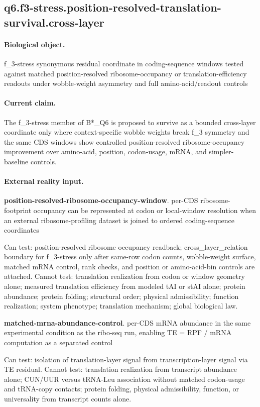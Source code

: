 \subsection{q6.f3-stress.position-resolved-translation-survival.cross-layer}

\paragraph{Biological object.} f\_3-stress synonymous residual coordinate in coding-sequence windows tested against matched position-resolved ribosome-occupancy or translation-efficiency readouts under wobble-weight asymmetry and full amino-acid/readout controls

\paragraph{Current claim.} The f\_3-stress member of B*\_Q6 is proposed to survive as a bounded cross-layer coordinate only where context-specific wobble weights break f\_3 symmetry and the same CDS windows show controlled position-resolved ribosome-occupancy improvement over amino-acid, position, codon-usage, mRNA, and simpler-baseline controls.

\paragraph{External reality input.}
\textbf{position-resolved-ribosome-occupancy-window}. per-CDS ribosome-footprint occupancy can be represented at codon or local-window resolution when an external ribosome-profiling dataset is joined to ordered coding-sequence coordinates

Can test: position-resolved ribosome occupancy readback; cross\_layer\_relation boundary for f\_3-stress only after same-row codon counts, wobble-weight surface, matched mRNA control, rank checks, and position or amino-acid-bin controls are attached. Cannot test: translation realization from codon or window geometry alone; measured translation efficiency from modeled tAI or stAI alone; protein abundance; protein folding; structural order; physical admissibility; function realization; system phenotype; translation mechanism; global biological law.

\textbf{matched-mrna-abundance-control}. per-CDS mRNA abundance in the same experimental condition as the ribo-seq run, enabling TE = RPF / mRNA computation as a separated control

Can test: isolation of translation-layer signal from transcription-layer signal via TE residual. Cannot test: translation realization from transcript abundance alone; CUN/UUR versus tRNA-Leu association without matched codon-usage and tRNA-copy contacts; protein folding, physical admissibility, function, or universality from transcript counts alone.

